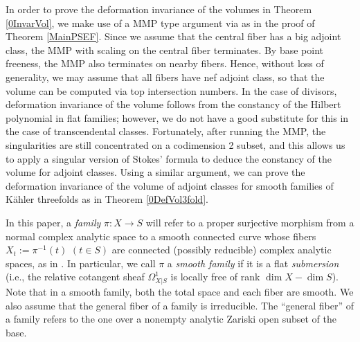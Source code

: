 \documentclass[12pt]{amsart}
\numberwithin{equation}{section}
\theoremstyle{definition}
\theoremstyle{plain}
\newtheorem*{thm A*}{Theorem A}
\newtheorem*{thm B*}{Theorem B}
\newtheorem*{thm C*}{Theorem C}
\newtheorem*{thm D*}{Theorem D}
\theoremstyle{definition}
\renewcommand{\1}{\mathds{1}}
\renewcommand{\>}{\rightarrow}
\begin{document}
In order to prove the deformation invariance of the volumes in Theorem \ref{0InvarVol}, we make use of a MMP type argument via \cite{DH24MMP} as in the proof of Theorem \ref{MainPSEF}. Since we assume that the central fiber has a big adjoint class, the MMP with scaling on the central fiber terminates. By base point freeness, the MMP also terminates on nearby fibers. Hence, without loss of generality, we may assume that all fibers have nef adjoint class, so that the volume can be computed via top intersection numbers. In the case of divisors, deformation invariance of the volume follows from the constancy of the Hilbert polynomial in flat families; however, we do not have a good substitute for this in the case of transcendental classes. Fortunately, after running the MMP, the singularities are still concentrated on a codimension 2 subset, and this allows us to apply a singular version of Stokes’ formula to deduce the constancy of the volume for adjoint classes. Using a similar argument, we can prove the deformation invariance of the volume of adjoint classes for smooth families of K\"ahler threefolds as in Theorem \ref{0DefVol3fold}.


In this paper, a \emph{family} $\pi: X\to S$ will refer to a proper surjective morphism from a normal complex analytic space
to a smooth connected curve whose fibers $X_t:=\pi^{-1}(t)$ $(t\in S)$ are connected (possibly reducible) complex analytic spaces, as in \cite{CRC25}. In particular, we call $\pi$ a \emph{smooth family} if it is a flat \emph{submersion}  (i.e., the relative cotangent sheaf $\Omega^1_{X|S}$ is locally
free of rank $\dim X -\dim S$). Note that in a smooth family, both the total space and each fiber are smooth. We also assume that the general fiber of a family is irreducible. The “general fiber” of a family refers to the one over a nonempty analytic Zariski open subset of the base. 
\end{document}
